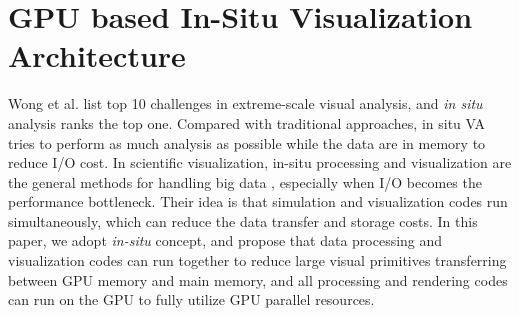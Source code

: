 \documentclass[journal]{vgtc}                %
\begin{document}
{%

 








\section{GPU based In-Situ Visualization Architecture}
Wong et al. \cite{wong2012top} list top 10 challenges in extreme-scale visual analysis, and \emph{in situ} analysis ranks the top one. Compared with traditional approaches, in situ VA tries to perform as much analysis as possible while the data are in memory to reduce I/O cost. In scientific visualization, in-situ processing and visualization are the general methods for handling big data \cite{ma2007situ}, especially when I/O becomes the performance bottleneck. Their idea is that simulation and visualization codes run simultaneously, which can reduce the data transfer and storage costs. In this paper, we adopt \emph{in-situ} concept, and propose that data processing and visualization codes can run together to reduce large visual primitives transferring between GPU memory and main memory, and all processing and rendering codes can run on the GPU to fully utilize GPU parallel resources.

}
\end{document}
